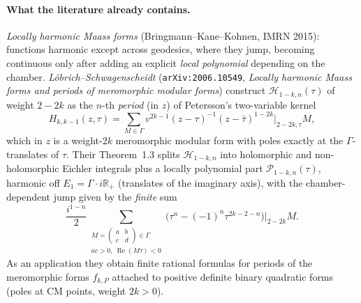 \documentclass[11pt]{article}
\newcommand{\Gam}{\Gamma}
\begin{document}
\paragraph{What the literature already contains.}
\emph{Locally harmonic Maass forms} (Bringmann--Kane--Kohnen, IMRN 2015): functions
harmonic except across geodesics, where they jump, becoming continuous only after adding
an explicit \emph{local polynomial} depending on the chamber. \emph{L\"obrich--Schwagenscheidt}
(\texttt{arXiv:2006.10549}, \emph{Locally harmonic Maass forms and periods of meromorphic
modular forms}) construct $\mathcal{H}_{1-k,n}(\tau)$ of weight $2-2k$ as the $n$-th
\emph{period} (in $z$) of Petersson's two-variable kernel
\[
  H_{k,k-1}(z,\tau)=\sum_{M\in\Gam} v^{2k-1}(z-\tau)^{-1}(z-\bar\tau)^{1-2k}\big|_{2-2k,\tau}M,
\]
which in $z$ is a weight-$2k$ meromorphic modular form with poles exactly at the
$\Gam$-translates of $\tau$. Their Theorem~1.3 splits $\mathcal{H}_{1-k,n}$ into
holomorphic and non-holomorphic Eichler integrals plus a locally polynomial part
$\mathcal{P}_{1-k,n}(\tau)$, harmonic off $E_1=\Gam\cdot i\mathbb{R}_+$ (translates of the
imaginary axis), with the chamber-dependent jump given by the \emph{finite} sum
\[
  \frac{i^{1-n}}{2}\!\!\sum_{\substack{M=\left(\begin{smallmatrix}a&b\\c&d\end{smallmatrix}\right)\in\Gam\\ ac>0,\ \operatorname{Re}(M\tau)<0}}\!\!\bigl(\tau^{n}-(-1)^{n}\tau^{2k-2-n}\bigr)\big|_{2-2k}M .
\]
As an application they obtain finite rational formulas for periods of the meromorphic
forms $f_{k,P}$ attached to positive definite binary quadratic forms (poles at CM points,
weight $2k>0$).
\end{document}
